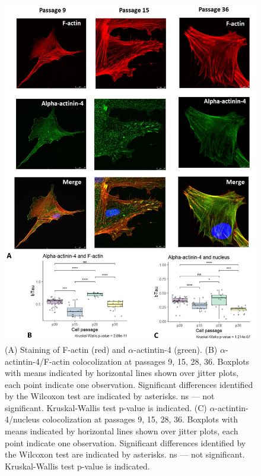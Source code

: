 \documentclass[alpha-refs]{wiley-article}
\begin{document}
\begin{figure}[hbt!]
\centering
\includegraphics[width=0.9\linewidth]{alpha-actinin-4.jpg}
\caption{(A) Staining of F-actin (red) and $\alpha$-actintin-4 (green).
(B) $\alpha$-actintin-4/F-actin colocolization at passages 9, 15, 28, 36. Boxplots with means indicated by horizontal lines shown over jitter plots, each point indicate one observation. Significant differences identified by the Wilcoxon test are indicated by asterisks. ns --- not significant. Kruskal-Wallis test p-value is indicated. (C) $\alpha$-actintin-4/nucleus colocolization at passages 9, 15, 28, 36. Boxplots with means indicated by horizontal lines shown over jitter plots, each point indicate one observation. Significant differences identified by the Wilcoxon test are indicated by asterisks. ns --- not significant. Kruskal-Wallis test p-value is indicated.}
\end{figure}
\end{document}

